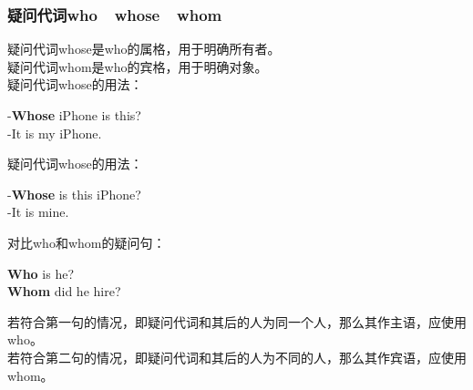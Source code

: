 \documentclass[UTF8]{ctexart}
\newcommand{\littf}[1]{{\hspace{3pt}\ttfamily #1}}
\begin{document}
\subsubsection{疑问代词\littf{who}~~\littf{whose}~~\littf{whom}}
    疑问代词\littf{whose}是\littf{who}的属格，用于明确所有者。\\[3mm]
    疑问代词\littf{whom\hphantom{x}}是\littf{who}的宾格，用于明确对象。\\[3mm]
    疑问代词\littf{whose}的用法：
    \begin{center}
        \large\ttfamily
        -\textbf{Whose} iPhone is this?\\[3mm]
        -It is my iPhone.\hphantom{xxxxx}\\[6mm]
    \end{center}
    疑问代词\littf{whose}的用法：
    \begin{center}
        \large\ttfamily
        -\textbf{Whose} is this iPhone?\\[3mm]
        -It is mine.\hphantom{xxxxxxxxxxx}\\[6mm]
    \end{center}
    对比\littf{who}和\littf{whom}的疑问句：
    \begin{center}
        \large\ttfamily
        \textbf{Who} is he?\\[3mm]
        \textbf{Whom} did he hire?\\[6mm]
    \end{center}
    若符合第一句的情况，即疑问代词和其后的人为同一个人，那么其作主语，应使用\littf{who}。\\[3mm]
    若符合第二句的情况，即疑问代词和其后的人为不同的人，那么其作宾语，应使用\littf{whom}。

\newpage
\end{document}
